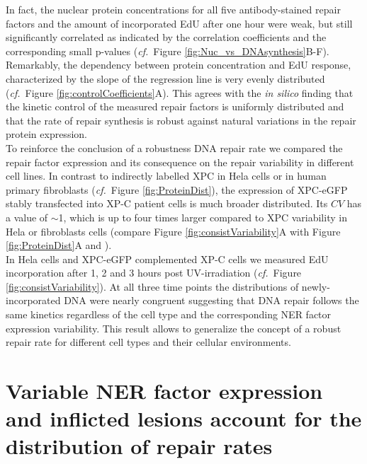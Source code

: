 \clearpage
In fact, the nuclear protein concentrations for all five antibody-stained repair factors and the amount of incorporated EdU after one hour were weak, but still significantly correlated as indicated by the correlation coefficients and the corresponding small p-values (\textit{cf.}\ Figure \ref{fig:Nuc_vs_DNAsynthesis}B-F). Remarkably, the dependency between protein concentration and EdU response, characterized by the slope of the regression line is very evenly distributed (\textit{cf.}\ Figure \ref{fig:controlCoefficients}A). This agrees with the \textit{in silico} finding that the kinetic control of the measured repair factors is uniformly distributed and that the rate of repair synthesis is robust against natural variations in the repair protein expression.\\ 
To reinforce the conclusion of a robustness DNA repair rate we compared the repair factor expression and its consequence on the repair variability in different cell lines. In contrast to indirectly labelled XPC in Hela cells \cite{Verbruggen2014} or in human primary fibroblasts (\textit{cf.}\ Figure \ref{fig:ProteinDist}), the expression of XPC-eGFP stably transfected into XP-C patient cells is much broader distributed. Its $CV$ has a value of $\sim$1, which is up to four times larger compared to XPC variability in Hela or fibroblasts cells (compare Figure \ref{fig:consistVariability}A with Figure \ref{fig:ProteinDist}A and \cite{Verbruggen2014}). \\
In Hela cells and XPC-eGFP complemented XP-C cells we measured EdU incorporation after 1, 2 and 3 hours post UV-irradiation (\textit{cf.}\ Figure \ref{fig:consistVariability}). At all three time points the distributions of newly-incorporated DNA were nearly congruent suggesting that DNA repair follows the same kinetics regardless of the cell type and the corresponding NER factor expression variability. This result allows to generalize the concept of a robust repair rate for different cell types and their cellular environments.\\ 






\section{Variable NER factor expression and inflicted lesions account for the distribution of repair rates} 
\label{sec:variabilityAnalysis}

